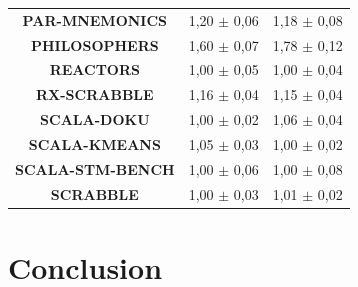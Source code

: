 \documentclass[]{usiinfthesis}
\begin{document}
\begin{table}
\begin{tabular}{|c|c|c|}
\textbf{	PAR-MNEMONICS	}&	 1,20 	 $\pm$ 	 0,06 	 & 	 1,18 	 $\pm$ 	 0,08 	\\
\textbf{	PHILOSOPHERS	}&	 1,60 	 $\pm$ 	 0,07 	 & 	 1,78 	 $\pm$ 	 0,12 	\\
\textbf{	REACTORS	}&	 1,00 	 $\pm$ 	 0,05 	 & 	 1,00 	 $\pm$ 	 0,04 	\\
\textbf{	RX-SCRABBLE	}&	 1,16 	 $\pm$ 	 0,04 	 & 	 1,15 	 $\pm$ 	 0,04 	\\
\textbf{	SCALA-DOKU	}&	 1,00 	 $\pm$ 	 0,02 	 & 	 1,06 	 $\pm$ 	 0,04 	\\
\textbf{	SCALA-KMEANS	}&	 1,05 	 $\pm$ 	 0,03 	 & 	 1,00 	 $\pm$ 	 0,02 	\\
\textbf{	SCALA-STM-BENCH	}&	 1,00 	 $\pm$ 	 0,06 	 & 	 1,00 	 $\pm$ 	 0,08 	\\
\textbf{	SCRABBLE	}&	 1,00 	 $\pm$ 	 0,03 	 & 	 1,01 	 $\pm$ 	 0,02 	\\

\hline
\end{tabular}
\end{table}%



\chapter{Conclusion}

\backmatter


\end{document}
